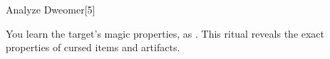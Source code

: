 \begin{spellsection}{Analyze Dweomer}[5]
    \begin{spellheader}
    \end{spellheader}
    \begin{spellcontent}
        \begin{spelltargetinginfo}
        \end{spelltargetinginfo}
        \begin{spelleffects}
            \spelleffect You learn the target's magic properties, as . This ritual reveals the exact properties of cursed items and artifacts.
        \end{spelleffects}
    \end{spellcontent}
    \begin{spellfooter}
    \end{spellfooter}
\end{spellsection}

